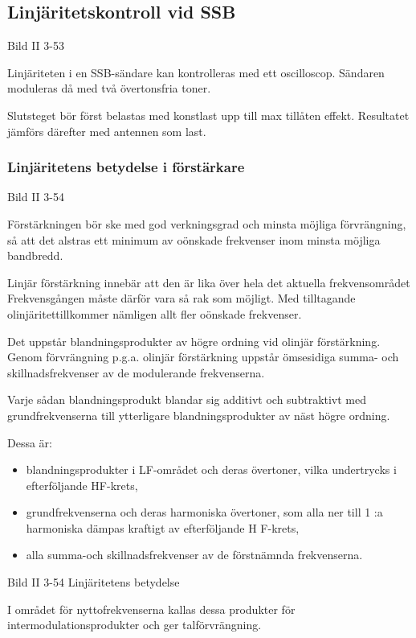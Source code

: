 \subsection{Linjäritetskontroll vid SSB}

Bild II 3-53

Linjäriteten i en SSB-sändare kan kontrolleras med ett
oscilloscop. Sändaren moduleras då med två övertonsfria toner.

Slutsteget bör först belastas med konstlast upp till max tillåten
effekt. Resultatet jämförs därefter med antennen som last.

\subsubsection{Linjäritetens betydelse i förstärkare}

Bild II 3-54

Förstärkningen bör ske med god verkningsgrad och minsta möjliga
förvrängning, så att det alstras ett minimum av oönskade frekvenser
inom minsta möjliga bandbredd.

Linjär förstärkning innebär att den är lika över hela det aktuella
frekvensområdet Frekvensgången måste därför vara så rak som
möjligt. Med tilltagande olinjäritettillkommer nämligen allt fler
oönskade frekvenser.

Det uppstår blandningsprodukter av högre ordning vid olinjär
förstärkning. Genom förvrängning p.g.a. olinjär förstärkning uppstår
ömsesidiga summa- och skillnadsfrekvenser av de modulerande
frekvenserna.

Varje sådan blandningsprodukt blandar sig additivt och subtraktivt med
grundfrekvenserna till ytterligare blandningsprodukter av näst högre
ordning.

Dessa är:
\begin{itemize}
\item blandningsprodukter i LF-området och deras övertoner, vilka
  undertrycks i efterföljande HF-krets,

\item grundfrekvenserna och deras harmoniska övertoner, som alla ner
  till 1 :a harmoniska dämpas kraftigt av efterföljande H F-krets,

\item alla summa-och skillnadsfrekvenser av de förstnämnda frekvenserna.
\end{itemize}

Bild II 3-54 Linjäritetens betydelse

I området för nyttofrekvenserna kallas dessa produkter för
intermodulationsprodukter och ger talförvrängning.

